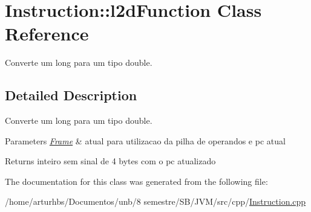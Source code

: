\hypertarget{classInstruction_1_1l2dFunction}{}\section{Instruction\+:\+:l2d\+Function Class Reference}
\label{classInstruction_1_1l2dFunction}


Converte um long para um tipo double.  




\subsection{Detailed Description}
Converte um long para um tipo double. 


\begin{DoxyParams}{Parameters}
{\em \hyperlink{classFrame}{Frame}} & atual para utilizacao da pilha de operandos e pc atual \\
\hline
\end{DoxyParams}
\begin{DoxyReturn}{Returns}
inteiro sem sinal de 4 bytes com o pc atualizado 
\end{DoxyReturn}


The documentation for this class was generated from the following file\+:\begin{DoxyCompactItemize}
\item 
/home/arturhbs/\+Documentos/unb/8 semestre/\+S\+B/\+J\+V\+M/src/cpp/\hyperlink{Instruction_8cpp}{Instruction.\+cpp}\end{DoxyCompactItemize}
